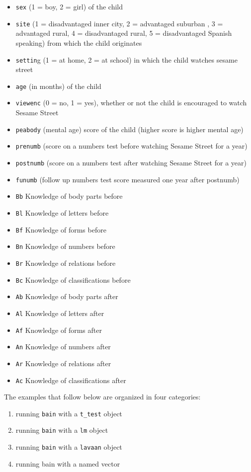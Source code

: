\documentclass[
]{book}
\providecommand{\tightlist}{%
  \setlength{\itemsep}{0pt}\setlength{\parskip}{0pt}}
\begin{document}
\begin{itemize}
\tightlist
\item
  \texttt{sex} (1 = boy, 2 = girl) of the child
\item
  \texttt{site} (1 = disadvantaged inner city, 2 = advantaged suburban , 3 =
  advantaged rural,
  4 = disadvantaged rural, 5 = disadvantaged Spanish speaking) from which
  the child originates
\item
  \texttt{settin}g (1 = at home, 2 = at school) in which the child watches sesame
  street
\item
  \texttt{age} (in months) of the child
\item
  \texttt{viewenc} (0 = no, 1 = yes), whether or not the child is encouraged to
  watch Sesame Street
\item
  \texttt{peabody} (mental age) score of the child (higher score is higher mental
  age)
\item
  \texttt{prenumb} (score on a numbers test before watching Sesame Street for a
  year)
\item
  \texttt{postnumb} (score on a numbers test after watching Sesame Street for a
  year)
\item
  \texttt{funumb} (follow up numbers test score measured one year after postnumb)
\item
  \texttt{Bb} Knowledge of body parts before
\item
  \texttt{Bl} Knowledge of letters before
\item
  \texttt{Bf} Knowledge of forms before
\item
  \texttt{Bn} Knowledge of numbers before
\item
  \texttt{Br} Knowledge of relations before
\item
  \texttt{Bc} Knowledge of classifications before
\item
  \texttt{Ab} Knowledge of body parts after
\item
  \texttt{Al} Knowledge of letters after
\item
  \texttt{Af} Knowledge of forms after
\item
  \texttt{An} Knowledge of numbers after
\item
  \texttt{Ar} Knowledge of relations after
\item
  \texttt{Ac} Knowledge of classifications after
\end{itemize}

The examples that follow below are organized in four categories:

\begin{enumerate}
\def\labelenumi{\arabic{enumi})}
\tightlist
\item
  running \texttt{bain} with a \texttt{t\_test} object
\item
  running \texttt{bain} with a \texttt{lm} object
\item
  running \texttt{bain} with a \texttt{lavaan} object
\item
  running bain with a named vector
\end{enumerate}
\end{document}
